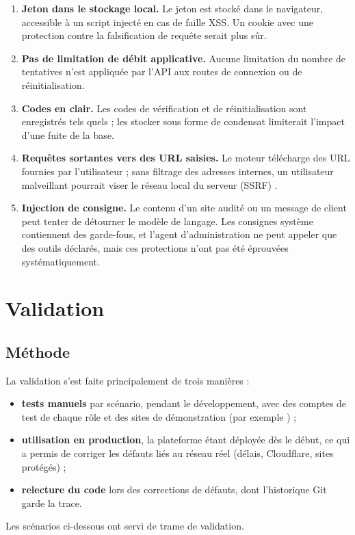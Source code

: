 \begin{enumerate}
  \item \textbf{Jeton dans le stockage local.} Le jeton est stocké dans le navigateur, accessible à un script injecté en cas de faille XSS. Un cookie  avec une protection contre la falsification de requête serait plus sûr.
  \item \textbf{Pas de limitation de débit applicative.} Aucune limitation du nombre de tentatives n'est appliquée par l'API aux routes de connexion ou de réinitialisation. 
  \item \textbf{Codes en clair.} Les codes de vérification et de réinitialisation sont enregistrés tels quels ; les stocker sous forme de condensat limiterait l'impact d'une fuite de la base.
  \item \textbf{Requêtes sortantes vers des URL saisies.} Le moteur télécharge des URL fournies par l'utilisateur ; sans filtrage des adresses internes, un utilisateur malveillant pourrait viser le réseau local du serveur (SSRF) \cite{owasptop10}. 
  \item \textbf{Injection de consigne.} Le contenu d'un site audité ou un message de client peut tenter de détourner le modèle de langage. Les consignes système contiennent des garde-fous, et l'agent d'administration ne peut appeler que des outils déclarés, mais ces protections n'ont pas été éprouvées systématiquement.
\end{enumerate}

\section{Validation}

\subsection{Méthode}
La validation s'est faite principalement de trois manières :
\begin{itemize}
  \item \textbf{tests manuels} par scénario, pendant le développement, avec des comptes de test de chaque rôle et des sites de démonstration (par exemple ) ;
  \item \textbf{utilisation en production}, la plateforme étant déployée dès le début, ce qui a permis de corriger les défauts liés au réseau réel (délais, Cloudflare, sites protégés) ;
  \item \textbf{relecture du code} lors des corrections de défauts, dont l'historique Git garde la trace.
\end{itemize}
Les scénarios ci-dessous ont servi de trame de validation.

